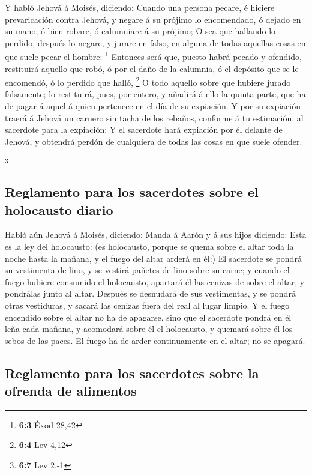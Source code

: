  Y habló Jehová á Moisés, diciendo:  Cuando una
persona pecare, é hiciere prevaricación contra Jehová, y negare á su
prójimo lo encomendado, ó dejado en su mano, ó bien robare, ó calumniare
á su prójimo;  O sea que hallando lo perdido, después lo
negare, y jurare en falso, en alguna de todas aquellas cosas en que
suele pecar el hombre: \footnote{\textbf{6:3} Éxod 28,42} 
Entonces será que, puesto habrá pecado y ofendido, restituirá aquello
que robó, ó por el daño de la calumnia, ó el depósito que se le
encomendó, ó lo perdido que halló, \footnote{\textbf{6:4} Lev 4,12}
 O todo aquello sobre que hubiere jurado falsamente; lo
restituirá, pues, por entero, y añadirá á ello la quinta parte, que ha
de pagar á aquel á quien pertenece en el día de su expiación.
 Y por su expiación traerá á Jehová un carnero sin tacha de
los rebaños, conforme á tu estimación, al sacerdote para la expiación:
 Y el sacerdote hará expiación por él delante de Jehová, y
obtendrá perdón de cualquiera de todas las cosas en que suele ofender.

\footnote{\textbf{6:7} Lev 2,-1}

\hypertarget{reglamento-para-los-sacerdotes-sobre-el-holocausto-diario}{%
\subsection{Reglamento para los sacerdotes sobre el holocausto
diario}\label{reglamento-para-los-sacerdotes-sobre-el-holocausto-diario}}

 Habló aún Jehová á Moisés, diciendo:  Manda á
Aarón y á sus hijos diciendo: Esta es la ley del holocausto: (es
holocausto, porque se quema sobre el altar toda la noche hasta la
mañana, y el fuego del altar arderá en él:)  El sacerdote
se pondrá su vestimenta de lino, y se vestirá pañetes de lino sobre su
carne; y cuando el fuego hubiere consumido el holocausto, apartará él
las cenizas de sobre el altar, y pondrálas junto al altar. 
Después se desnudará de sus vestimentas, y se pondrá otras vestiduras, y
sacará las cenizas fuera del real al lugar limpio.  Y el
fuego encendido sobre el altar no ha de apagarse, sino que el sacerdote
pondrá en él leña cada mañana, y acomodará sobre él el holocausto, y
quemará sobre él los sebos de las paces.  El fuego ha de
arder continuamente en el altar; no se apagará.

\hypertarget{reglamento-para-los-sacerdotes-sobre-la-ofrenda-de-alimentos}{%
\subsection{Reglamento para los sacerdotes sobre la ofrenda de
alimentos}\label{reglamento-para-los-sacerdotes-sobre-la-ofrenda-de-alimentos}}

